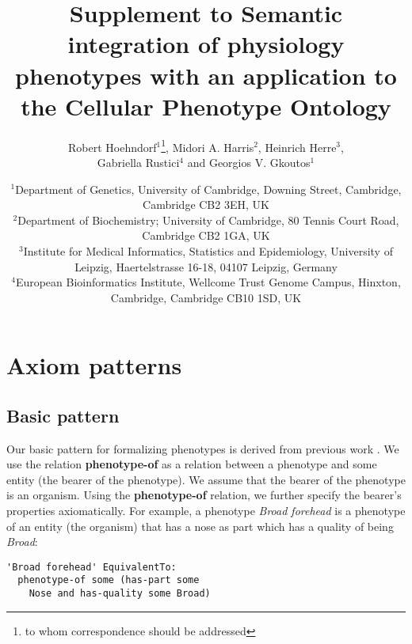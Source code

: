 \documentclass{article}
\begin{document}
\title{Supplement to Semantic integration of physiology phenotypes with an
  application to the Cellular Phenotype Ontology}

\author{Robert Hoehndorf$^{1}$\footnote{to whom correspondence should
    be addressed}, Midori A. Harris$^2$, Heinrich Herre$^3$, \\Gabriella
  Rustici$^4$ and Georgios V. Gkoutos$^{1}$}

\date{$^{1}$Department of Genetics, University of Cambridge,
  Downing Street, Cambridge, Cambridge CB2 3EH, UK\\
  $^{2}$Department of Biochemistry; University of Cambridge, 80 Tennis
  Court Road, Cambridge CB2 1GA, UK\\
  $^{3}$Institute for Medical Informatics, Statistics and
  Epidemiology, University of Leipzig, Haertelstrasse 16-18, 04107
  Leipzig, Germany\\
  $^{4}$European Bioinformatics Institute, Wellcome Trust Genome
  Campus, Hinxton, Cambridge, Cambridge CB10 1SD, UK}

\maketitle

\section{Axiom patterns}

\subsection{Basic pattern}
Our basic pattern for formalizing phenotypes is derived from previous
work \cite{Hoehndorf2010phene}. We use the relation {\bf phenotype-of}
as a relation between a phenotype and some entity (the bearer of the
phenotype). We assume that the bearer of the phenotype is an
organism. Using the {\bf phenotype-of} relation, we further specify
the bearer's properties axiomatically. For example, a phenotype {\em
  Broad forehead} is a phenotype of an entity (the organism) that has
a nose as part which has a quality of being {\em Broad}:
\begin{verbatim}
'Broad forehead' EquivalentTo:
  phenotype-of some (has-part some
    Nose and has-quality some Broad)
\end{verbatim}
\end{document}

